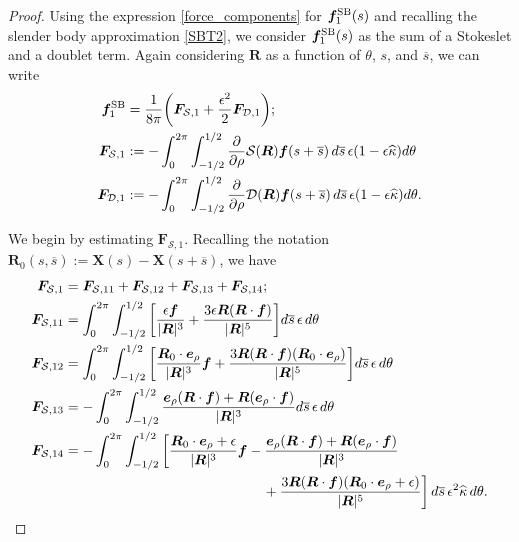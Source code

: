 \documentclass[11pt]{article}
\numberwithin{equation}{section}
\newcommand{\bars}{\overline s}
\newcommand{\X}{\bm{X}}
\newcommand{\be}{\bm{e}}
\newcommand{\p}{\partial}
\newcommand{\ts}{\thinspace}
\newcommand{\SB}{{\rm SB}}
\newcommand{\wh}[1]{\widehat{#1}}
\newcommand{\mc}[1]{\mathcal{#1}}
\theoremstyle{definition}
\begin{document}
\begin{proof}
Using the expression \eqref{force_components} for $\bm{f}^{\SB}_1(s)$ and recalling the slender body approximation \eqref{SBT2}, we consider $\bm{f}^{\SB}_1(s)$ as the sum of a Stokeslet and a doublet term. Again considering $\bm{R}$ as a function of $\theta$, $s$, and $\bars$, we can write
\begin{equation}\label{force_1}
\begin{aligned}
\bm{f}^{\SB}_1 &= \frac{1}{8\pi}\bigg(\bm{F}_{\mc{S},1} +\frac{\epsilon^2}{2}\bm{F}_{\mc{D},1}\bigg); \\
\bm{F}_{\mc{S},1} &:= -\int_0^{2\pi}\int_{-1/2}^{1/2} \frac{\p}{\p\rho}\mc{S}(\bm{R})\bm{f}(s+\bars) \ts d\bars \ts \epsilon(1-\epsilon\wh\kappa)d\theta \\
\bm{F}_{\mc{D},1}&:=  -\int_0^{2\pi}\int_{-1/2}^{1/2} \frac{\p}{\p\rho}\mc{D}(\bm{R})\bm{f}(s+\bars) \ts d\bars \ts \epsilon(1-\epsilon\wh\kappa) d\theta.
\end{aligned}
\end{equation}

We begin by estimating $\bm{F}_{\mc{S},1}$. Recalling the notation $\bm{R}_0(s,\bars):= \X(s)-\X(s+\bars)$, we have 
\begin{equation}\label{FS1}
\begin{aligned}
\bm{F}_{\mc{S},1} &= \bm{F}_{\mc{S},11} + \bm{F}_{\mc{S},12} + \bm{F}_{\mc{S},13}+ \bm{F}_{\mc{S},14}; \\
\bm{F}_{\mc{S},11}&= \int_0^{2\pi}\int_{-1/2}^{1/2} \bigg[\frac{\epsilon{\bm f}}{|\bm{R}|^3} +\frac{3\epsilon\bm{R}(\bm{R}\cdot\bm{f})}{|\bm{R}|^5} \bigg]  d\bars \ts \epsilon \ts d\theta\\
\bm{F}_{\mc{S},12}&= \int_0^{2\pi}\int_{-1/2}^{1/2} \bigg[\frac{\bm{R}_0\cdot\be_{\rho}}{|\bm{R}|^3}{\bm f} +\frac{3\bm{R}(\bm{R}\cdot\bm{f})(\bm{R}_0\cdot\be_{\rho})}{|\bm{R}|^5} \bigg]  d\bars \ts \epsilon \ts d\theta\\
\bm{F}_{\mc{S},13}&= -\int_0^{2\pi}\int_{-1/2}^{1/2} \frac{\be_{\rho}(\bm{R}\cdot\bm{f})+\bm{R}(\be_{\rho}\cdot\bm{f}) }{|\bm{R}|^3} d\bars \ts \epsilon \ts d\theta\\
\bm{F}_{\mc{S},14}&= -\int_0^{2\pi}\int_{-1/2}^{1/2} \bigg[\frac{\bm{R}_0\cdot\be_{\rho}+\epsilon}{|\bm{R}|^3}{\bm f} - \frac{\be_{\rho}(\bm{R}\cdot\bm{f})+\bm{R}(\be_{\rho}\cdot\bm{f})}{|\bm{R}|^3} \\
&\hspace{5cm} +\frac{3\bm{R}(\bm{R}\cdot\bm{f})(\bm{R}_0\cdot\be_{\rho}+\epsilon)}{|\bm{R}|^5}\bigg] \ts d\bars \ts \epsilon^2\wh\kappa \ts d\theta.
\end{aligned}
\end{equation}


\end{proof}
\end{document}
